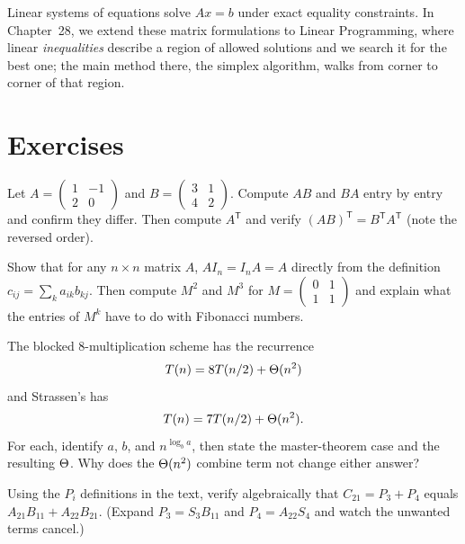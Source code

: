 Linear systems of equations solve $Ax = b$ under exact equality constraints. In Chapter~28, we extend these matrix formulations to Linear Programming, where linear \emph{inequalities} describe a region of allowed solutions and we search it for the best one; the main method there, the simplex algorithm, walks from corner to corner of that region.

\section*{Exercises}

\begin{exercise}
\label{ch27:ex-mult}
Let $A=\begin{pmatrix}1 & -1\\ 2 & 0\end{pmatrix}$ and
$B=\begin{pmatrix}3 & 1\\ 4 & 2\end{pmatrix}$. Compute $AB$ and $BA$ entry by
entry and confirm they differ. Then compute $A^{\mathsf T}$ and verify
$(AB)^{\mathsf T}=B^{\mathsf T}A^{\mathsf T}$ (note the reversed order).
\end{exercise}

\begin{exercise}
\label{ch27:ex-identity}
Show that for any $n\times n$ matrix $A$, $AI_n=I_nA=A$ directly from the
definition $c_{ij}=\sum_k a_{ik}b_{kj}$. Then compute $M^2$ and $M^3$ for
$M=\begin{pmatrix}0 & 1\\ 1 & 1\end{pmatrix}$ and explain what the entries of
$M^k$ have to do with Fibonacci numbers.
\end{exercise}

\begin{exercise}
\label{ch27:ex-strassen-count}
The blocked $8$-multiplication scheme has the recurrence
\[
T(n) = 8T(n/2) + \Theta(n^2)
\]
and Strassen's has
\[
T(n) = 7T(n/2) + \Theta(n^2).
\]
For each, identify $a$, $b$, and
$n^{\log_b a}$, then state the master-theorem case and the resulting $\Theta$. Why
does the $\Theta(n^2)$ combine term not change either answer?
\end{exercise}

\begin{exercise}
\label{ch27:ex-strassen-verify}
Using the $P_i$ definitions in the text, verify algebraically that
$C_{21}=P_3+P_4$ equals $A_{21}B_{11}+A_{22}B_{21}$. (Expand $P_3=S_3 B_{11}$ and
$P_4=A_{22}S_4$ and watch the unwanted terms cancel.)
\end{exercise}

